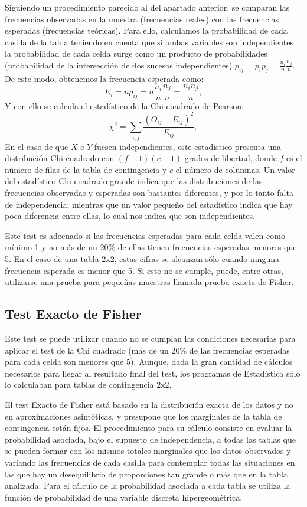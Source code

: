Siguiendo un procedimiento parecido al del apartado anterior, se comparan las frecuencias observadas en la muestra (frecuencias reales) con
las frecuencias esperadas (frecuencias teóricas). Para ello, calculamos la probabilidad de cada casilla de la tabla teniendo en cuenta que
si ambas variables son independientes la probabilidad de cada celda surge como un producto de probabilidades (probabilidad de la
intersección de dos sucesos independientes) $p_{ij}=p_ip_j=\frac{n_i}{n}\frac{n_j}{n}$. De este modo, obtenemos la frecuencia esperada como:
\[
E_i=np_{ij}=n\frac{n_i}{n}\frac{n_j}{n}=\frac{n_in_j}{n},
\]
Y con ello se calcula el estadístico de la Chi-cuadrado de Pearson:
\[
\chi ^2  = \sum_{i,j} \frac{(O_{ij}  - E_{ij} )^2}{E_{ij}},
\]
En el caso de que $X$ e $Y$ fuesen independientes, este estadístico presenta una distribución Chi-cuadrado con $(f-1)(c-1)$ grados de
libertad, donde $f$ es el número de filas de la tabla de contingencia y $c$ el número de columnas. Un valor del estadístico Chi-cuadrado
grande indica que las distribuciones de las frecuencias observadas y esperadas son bastantes diferentes, y por lo tanto falta de
independencia; mientras que un valor pequeño del estadístico indica que hay poca diferencia entre ellas, lo cual nos indica que son
independientes.

Este test es adecuado si las frecuencias esperadas para cada celda valen como mínimo 1 y no más de un $20\%$ de ellas tienen frecuencias
esperadas menores que 5. En el caso de una tabla 2x2, estas cifras se alcanzan sólo cuando ninguna frecuencia esperada es menor que 5. Si
esto no se cumple, puede, entre otras, utilizarse una prueba para pequeñas muestras llamada prueba exacta de Fisher.


\subsection{Test Exacto de Fisher}
Este test se puede utilizar cuando no se cumplan las condiciones necesarias para aplicar el test de la Chi cuadrado (más de un 20\% de las
frecuencias esperadas para cada celda son menores que 5). Aunque, dada la gran cantidad de cálculos necesarios para llegar al resultado
final del test, los programas de Estadística sólo lo calculaban para tablas de contingencia 2x2.

El test Exacto de Fisher está basado en la distribución exacta de los datos y no en aproximaciones asintóticas, y presupone que los
marginales de la tabla de contingencia están fijos. El procedimiento para su cálculo consiste en evaluar la probabilidad asociada, bajo el
supuesto de independencia, a todas las tablas que se pueden formar con los mismos totales marginales que los datos observados y variando las
frecuencias de cada casilla para contemplar todas las situaciones en las que hay un desequilibrio de proporciones tan grande o más que en la
tabla analizada. Para el cálculo de la probabilidad asociada a cada tabla se utiliza la función de probabilidad de una variable discreta
hipergeométrica.

